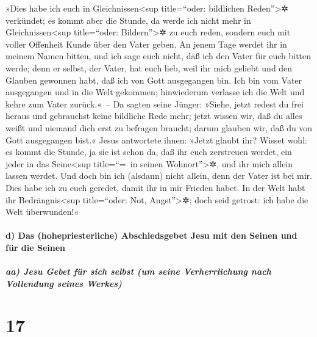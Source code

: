  »Dies habe ich euch in Gleichnissen\textless sup
title=``oder: bildlichen Reden''\textgreater✲ verkündet; es kommt aber
die Stunde, da werde ich nicht mehr in Gleichnissen\textless sup
title=``oder: Bildern''\textgreater✲ zu euch reden, sondern euch mit
voller Offenheit Kunde über den Vater geben.  An jenem
Tage werdet ihr in meinem Namen bitten, und ich sage euch nicht, daß ich
den Vater für euch bitten werde;  denn er selbst, der
Vater, hat euch lieb, weil ihr mich geliebt und den Glauben gewonnen
habt, daß ich von Gott ausgegangen bin.  Ich bin vom
Vater ausgegangen und in die Welt gekommen; hinwiederum verlasse ich die
Welt und kehre zum Vater zurück.«~--  Da sagten seine
Jünger: »Siehe, jetzt redest du frei heraus und gebrauchst keine
bildliche Rede mehr;  jetzt wissen wir, daß du alles
weißt und niemand dich erst zu befragen braucht; darum glauben wir, daß
du von Gott ausgegangen bist.«  Jesus antwortete ihnen:
»Jetzt glaubt ihr?  Wisset wohl: es kommt die Stunde, ja
sie ist schon da, daß ihr euch zerstreuen werdet, ein jeder in das
Seine\textless sup title=``=~in seinen Wohnort''\textgreater✲, und ihr
mich allein lassen werdet. Und doch bin ich (alsdann) nicht allein, denn
der Vater ist bei mir.  Dies habe ich zu euch geredet,
damit ihr in mir Frieden habet. In der Welt habt ihr
Bedrängnis\textless sup title=``oder: Not, Angst''\textgreater✲; doch
seid getrost: ich habe die Welt überwunden!«

\hypertarget{d-das-hohepriesterliche-abschiedsgebet-jesu-mit-den-seinen-und-fuxfcr-die-seinen}{%
\paragraph{d) Das (hohepriesterliche) Abschiedsgebet Jesu mit den Seinen
und für die
Seinen}\label{d-das-hohepriesterliche-abschiedsgebet-jesu-mit-den-seinen-und-fuxfcr-die-seinen}}

\hypertarget{aa-jesu-gebet-fuxfcr-sich-selbst-um-seine-verherrlichung-nach-vollendung-seines-werkes}{%
\subparagraph{aa) Jesu Gebet für sich selbst (um seine Verherrlichung
nach Vollendung seines
Werkes)}\label{aa-jesu-gebet-fuxfcr-sich-selbst-um-seine-verherrlichung-nach-vollendung-seines-werkes}}

\hypertarget{section-16}{%
\section{17}\label{section-16}}

